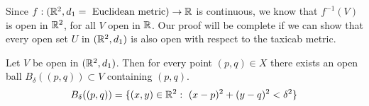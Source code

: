
\begin{solution}
    Since $f : (\mathbb{R}^2, d_1 =  \
    \text{Euclidean metric}) \to \mathbb{R}$ is continuous,
    we know that $f^{-1}(V)$ is open in $\mathbb{R}^2$, for all
    $V$ open in $\mathbb{R}$. Our proof will be complete if we
    can show that every open set $U$ in $(\mathbb{R}^2,d_1)$
    is also
    open with respect to the taxicab metric.

    \vspace*{3mm}
    Let $V$ be open in $(\mathbb{R}^2, d_1)$. Then for
    every point $(p,q)\in X$ there exists an open ball
    $B_\delta((p,q))\subset V$ containing $(p,q)$.
    $$B_\delta((p,q))=\{(x,y)\in\mathbb{R}^2:
    \ (x-p)^2+(y-q)^2<\delta^2\}$$
\end{solution}